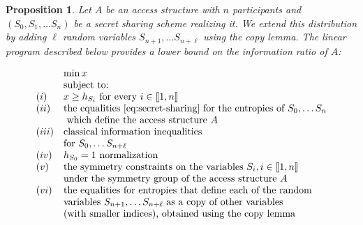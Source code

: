 \documentclass[11pt, a4paper]{kybernetika}
\newtheorem{proposition}[theorem]{Proposition}
\begin{document}
	\begin{proposition}\label{p:linear-program-for-ratio}
		Let $A$ be an access structure with $n$ participants and $(S_0,S_1,\ldots S_n)$ be a secret sharing scheme realizing it. We extend this distribution by adding $\ell$ random variables $S_{n+1},\ldots S_{n+\ell}$ using the copy lemma.
		The linear program described below provides a lower bound on the information ratio of $A$:
		
		$$
		\begin{array}{ll}
			&\min x\\
			&\text{subject to:}\\
			(i)&x\ge h_{S_i}\text{ for every } i\in\llbracket1,n\rrbracket\\
			(ii)&\text{the equalities \eqref{eq:secret-sharing} for the entropies of }S_0,\ldots S_n\\
			&\text{ which define the access structure }A\\
			(iii)&\text{classical information inequalities}\\&\text{for }S_0,\ldots S_{n+\ell}\\
			(iv)&h_{S_0}=1\text{ normalization}\\
			(v)&\text{the symmetry constraints on the variables }S_i,i\in\llbracket1,n\rrbracket\\
			&\text{under the symmetry group of the access structure }A\\	
			(vi)&\text{the equalities for entropies that define each of the random}\\
			&\text{variables }S_{n+1},\ldots S_{n+\ell}\text{ as a copy of other variables}\\
			&\text{(with smaller indices), obtained using the copy lemma}
		\end{array}
		$$
	\end{proposition}
\end{document}
